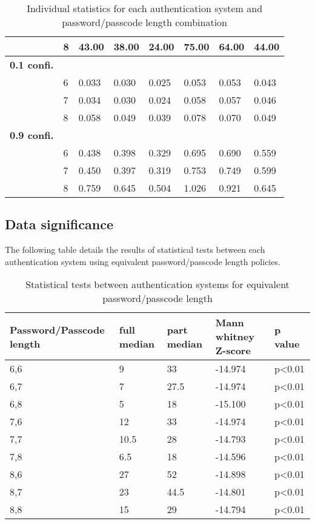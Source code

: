 \documentclass[british,11pt,a4paper]{article}
\begin{document}
\begin{appendices}
\begin{table}[!htb]
\begin{tabular}{|l|l|l|l|l|l|l|l|}
		 & 8 & 43.00 & 38.00 & 24.00 & 75.00 & 64.00 & 44.00 \\ \hline
		\textbf{0.1 confi.} &  &  &  &  &  &  &  \\ \hline
		 & 6 & 0.033 & 0.030 & 0.025 & 0.053 & 0.053 & 0.043 \\ \hline
		 & 7 & 0.034 & 0.030 & 0.024 & 0.058 & 0.057 & 0.046 \\ \hline
		 & 8 & 0.058 & 0.049 & 0.039 & 0.078 & 0.070 & 0.049 \\ \hline
		\textbf{0.9 confi.} &  &  &  &  &  &  &  \\ \hline
		 & 6 & 0.438 & 0.398 & 0.329 & 0.695 & 0.690 & 0.559 \\ \hline
		 & 7 & 0.450 & 0.397 & 0.319 & 0.753 & 0.749 & 0.599 \\ \hline
		 & 8 & 0.759 & 0.645 & 0.504 & 1.026 & 0.921 & 0.645 \\ \hline
		\end{tabular}
		\caption{Individual statistics for each authentication system and password/passcode length combination}
	\end{table}
	\clearpage

  	\subsection{Data significance}
  	\label{app:significant_stats}
  	The following table details the results of statistical tests between each authentication system using equivalent password/passcode length policies.
  	\begin{table}[!htb]
	\centering
	\begin{tabular}{|l|l|l|l|l|}
	\hline
	\textbf{Password/Passcode length} & \textbf{full median} & \textbf{part median} & \textbf{Mann whitney Z-score} & \textbf{p value} \\ \hline
	6,6 & 9 & 33 & -14.974 & p\textless0.01 \\ \hline
	6,7 & 7 & 27.5 & -14.974 & p\textless0.01 \\ \hline
	6,8 & 5 & 18 & -15.100 & p\textless0.01 \\ \hline
	7,6 & 12 & 33 & -14.974 & p\textless0.01 \\ \hline
	7,7 & 10.5 & 28 & -14.793 & p\textless0.01 \\ \hline
	7,8 & 6.5 & 18 & -14.596 & p\textless0.01 \\ \hline
	8,6 & 27 & 52 & -14.898 & p\textless0.01 \\ \hline
	8,7 & 23 & 44.5 & -14.801 & p\textless0.01 \\ \hline
	8,8 & 15 & 29 & -14.794 & p\textless0.01 \\ \hline
	\end{tabular}
	\caption{Statistical tests between authentication systems for equivalent password/passcode length}
	\label{tab:significance}
	\end{table}
	\clearpage

\end{appendices}
\end{document}
